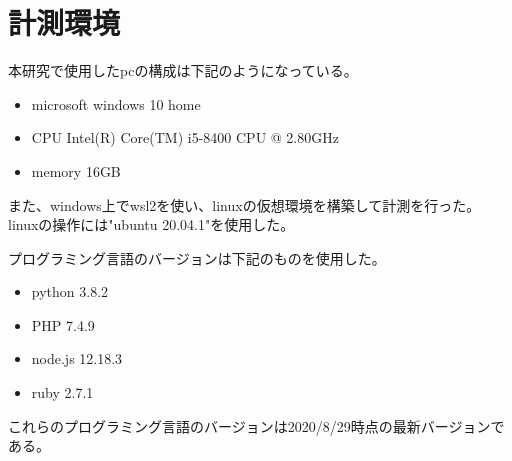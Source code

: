 \chapter{計測環境}
\label{cha:environment}
本研究で使用したpcの構成は下記のようになっている。
\begin{itemize}
  \item microsoft windows 10 home
  \item CPU Intel(R) Core(TM) i5-8400 CPU @ 2.80GHz
  \item memory 16GB
\end{itemize}

また、windows上でwsl2を使い、linuxの仮想環境を構築して計測を行った。
linuxの操作には"ubuntu 20.04.1"を使用した。

プログラミング言語のバージョンは下記のものを使用した。
\begin{itemize}
  \item python 3.8.2
  \item PHP 7.4.9
　\item node.js 12.18.3
  \item ruby 2.7.1
\end{itemize}
これらのプログラミング言語のバージョンは2020/8/29時点の最新バージョンである。